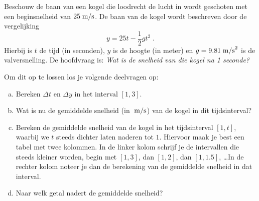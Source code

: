 \documentclass[12pt]{article}
\begin{document}
\begin{oefening}
Beschouw de baan van een kogel die loodrecht de lucht in wordt geschoten met een beginsnelheid van $25\;\mbox{m/s}$. De baan van de kogel wordt beschreven door de vergelijking
$$y=25t-\frac{1}{2}gt^2\;.$$
Hierbij is $t$ de tijd (in seconden), $y$ is de hoogte (in meter) en $g=9.81\;\mbox{m/s}^2$ is de valversnelling. De hoofdvraag is: {\em Wat is de snelheid van die kogel na 1 seconde?}

Om dit op te lossen los je volgende deelvragen op:
\begin{enumerate}[(a)]
  \item Bereken $\Delta t$ en $\Delta y$ in het interval $[1,3]$.
  \item Wat is nu de gemiddelde snelheid (in $\;\mbox{m/s}$) van de kogel in dit tijdsinterval?
  \item Bereken de gemiddelde snelheid van de kogel in het tijdsinterval $[1,t]$, waarbij we $t$ steeds dichter laten naderen tot $1$. Hiervoor maak je best een tabel met twee kolommen. In de linker kolom schrijf je de intervallen die steeds kleiner worden, begin met $[1,3]$, dan $[1,2]$, dan $[1,1.5]$, \ldots In de rechter kolom noteer je dan de berekening van de gemiddelde snelheid in dat interval.
  \item Naar welk getal nadert de gemiddelde snelheid?
\end{enumerate}
\end{oefening}
\end{document}
